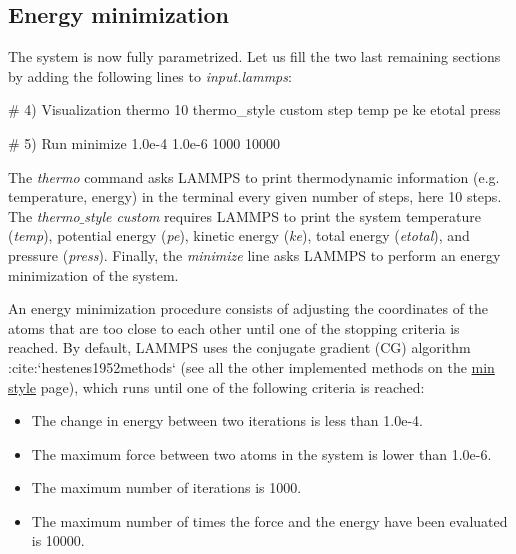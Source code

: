 \subsection{Energy minimization}
\noindent The system is now fully parametrized. Let us fill the two last remaining sections
by adding the following lines to \textit{input.lammps}:

\begin{lcverbatim}
# 4) Visualization
thermo 10
thermo_style custom step temp pe ke etotal press

# 5) Run
minimize 1.0e-4 1.0e-6 1000 10000
\end{lcverbatim}

\noindent The \textit{thermo} command asks LAMMPS to print
thermodynamic information (e.g. temperature, energy) in the
terminal every given number of steps, here 10 steps. 
The \textit{thermo$\_$style custom} requires LAMMPS to print 
the system temperature (\textit{temp}), potential energy (\textit{pe}),
kinetic energy (\textit{ke}), total energy (\textit{etotal}),
and pressure (\textit{press}). Finally, the \textit{minimize} line
asks LAMMPS to perform an energy minimization of the system.

\begin{tcolorbox}[colback=mylightblue!5!white,colframe=mylightblue!75!black,title=About energy minimization]

\vspace{0.25cm} \noindent An energy minimization procedure consists of adjusting
the coordinates of the atoms that are too close to each other until one of the stopping
criteria is reached. By default, LAMMPS uses the conjugate
gradient (CG) algorithm :cite:`hestenes1952methods` (see all the other
implemented methods on the \href{https://docs.lammps.org/min_style.html}{min style} page), which runs 
until one of the following criteria is reached:

\begin{itemize}
\item The change in energy between two iterations is less than 1.0e-4.
\item The maximum force between two atoms in the system is lower than 1.0e-6.
\item The maximum number of iterations is 1000.
\item The maximum number of times the force and the energy have been evaluated is 10000.
\end{itemize}
\end{tcolorbox}

